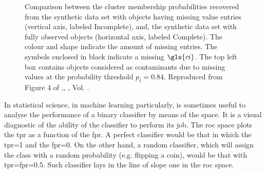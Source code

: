 \begin{figure}[!htp]
\begin{center}
\caption{Comparison between the cluster membership probabilities recovered from the synthetic data set with objects having missing value entries (vertical axis, labeled Incomplete), and, the synthetic data set with fully observed objects (horizontal axis, labeled Complete). The colour and shape indicate the amount of missing entries. The symbols enclosed in black indicate a missing $\gls{ci}$. The top left box contains objects considered as contaminants due to missing values at the probability threshold $p_t=0.84$. Reproduced from Figure 4 of \citet{Olivares2017},\textit{}, , Vol. .}
\label{figure:IncVsCom}
\end{center}
\end{figure}

In statistical science, in machine learning particularly, is sometimes useful to analyse the performance of a binary classifier by means of the  space. It is a visual diagnostic of the ability of the classifier to perform its job. The \gls{roc} space plots the \gls{tpr} as a function of the \gls{fpr}. A perfect classifier would be that in which the \gls{tpr}=1 and the \gls{fpr}=0. On the other hand, a random classifier, which will assign the class with a random probability (e.g. flipping a coin),  would be that with \gls{tpr}=\gls{fpr}=0.5. Such classifier lays in the line of slope one in the \gls{roc} space.

